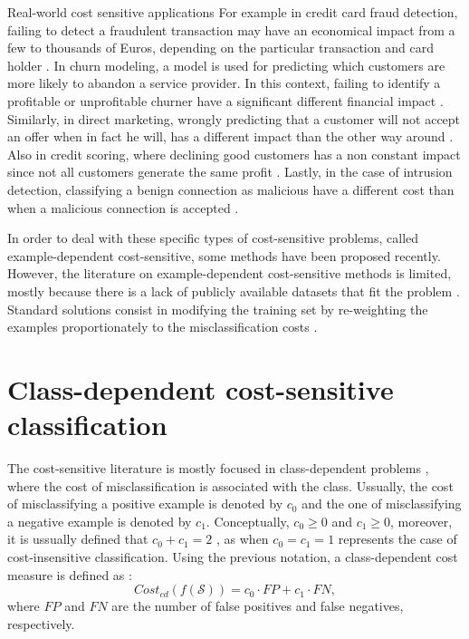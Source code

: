   \begin{remark}{Real-world cost sensitive applications}
  For example in credit card fraud detection, failing to detect a fraudulent transaction may have 
  an economical impact from a few to thousands of Euros, depending on the particular transaction 
  and card holder \citep{Sahin2013}. In churn modeling, a model is used for predicting which
  customers are more likely to abandon a service provider. In this context, failing to identify a 
  profitable or unprofitable churner have a significant different financial impact 
  \citep{Glady2009}. Similarly, in direct marketing, wrongly predicting that a customer will not 
  accept an offer when in fact he will, has a different impact than the other way around 
  \citep{Zadrozny2003}. Also in credit scoring, where declining good customers has a non constant 
  impact since not all  customers generate the same profit \citep{Verbraken2014}. Lastly, in the 
  case of intrusion   detection, classifying a benign connection as malicious have a different cost 
  than when a   malicious connection is accepted \citep{Ma2011}.
  \end{remark}

  In order to deal with these specific types of cost-sensitive problems, called example-dependent
  cost-sensitive, some methods have been proposed recently. However, the literature on 
  example-dependent cost-sensitive methods is limited, mostly because there is a lack of publicly 
  available datasets that fit the problem \citep{MacAodha2013}. Standard solutions consist in 
  modifying the training set by re-weighting the examples proportionately to the misclassification 
  costs \citep{Elkan2001,Zadrozny2003}.

  
\section{Class-dependent cost-sensitive classification}
\label{sec:3:class-dependent}

The cost-sensitive literature is mostly focused in class-dependent problems \citep{Elkan2001}, where 
the cost of misclassification is associated with the class. Ussually, the cost of misclassifying a 
positive example is denoted by $c_0$ and the one of misclassifying a negative example is denoted by 
$c_1$. Conceptually, $c_0\ge0$ and $c_1\ge0$, moreover, it is ussually defined that $c_0+c_1=2$ 
\citep{Flach2011a}, as when $c_0=c_1=1$ represents the case of cost-insensitive classification. 
Using the previous notation, a class-dependent cost measure is defined as \citep{Wang2014}:
\begin{equation}
  Cost_{cd}(f(\mathcal{S})) = c_0 \cdot FP + c_1 \cdot FN,
\end{equation}
where $FP$ and $FN$ are the number of false positives and false negatives, respectively.


